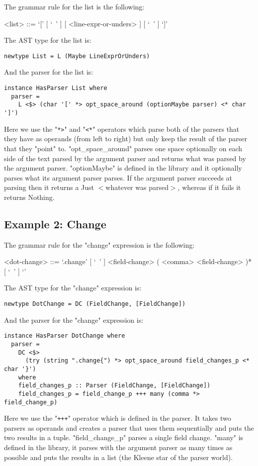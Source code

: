 \documentclass[diploma]{softlab-thesis}
\begin{document}
The grammar rule for the list is the following:
\begin{grammar}
<list> ::= `[' [ `\ ' ] [ <line-expr-or-unders> ] [ `\ ' ] `]' \\
\end{grammar}
The AST type for the list is:
\begin{verbatim}
newtype List = L (Maybe LineExprOrUnders)

\end{verbatim}
And the parser for the list is:
\begin{verbatim}
instance HasParser List where
  parser =
    L <$> (char '[' *> opt_space_around (optionMaybe parser) <* char ']')

\end{verbatim}
Here we use the "\verb|*>|" and "\verb|<*|" operators which parse both of
the parsers that they have as operands (from left to right) but only keep the
result of the parser that they "point" to. "opt_space_around" parses one space
optionally on each side of the text parsed by the argument parser and returns
what was parsed by the argument parser.  "optionMaybe" is defined in the
library and it optionally parses what its argument parser parses. If the
argument parser succeeds at parsing then it returns a Just $<$whatever was
parsed$>$, whereas if it fails it returns Nothing.

\subsection{Example 2: Change}

The grammar rule for the "change" expression is the following:
\begin{grammar}
<dot-change> ::=
`.change{' [ `\ ' ] <field-change> ( <comma> <field-change> )* [ `\ ' ] `}'
\\
\end{grammar}
The AST type for the "change" expression is:
\begin{verbatim}
newtype DotChange = DC (FieldChange, [FieldChange])

\end{verbatim}
And the parser for the "change" expression is:
\begin{verbatim}
instance HasParser DotChange where
  parser =
    DC <$>
      (try (string ".change{") *> opt_space_around field_changes_p <* char '}')
    where
    field_changes_p :: Parser (FieldChange, [FieldChange])
    field_changes_p = field_change_p +++ many (comma *> field_change_p)

\end{verbatim}
Here we use the "\verb|+++|" operator which is defined in the parser. It takes
two parsers as operands and creates a parser that uses them sequentially and
puts the two results in a tuple. "field_change_p" parses a single field change.
"many" is defined in the library, it parses with the argument parser as many
times as possible and puts the results in a list (the Kleene star of the parser
world).
\end{document}
